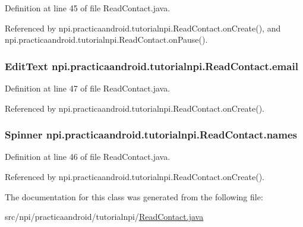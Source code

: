 Definition at line 45 of file Read\-Contact.\-java.



Referenced by npi.\-practicaandroid.\-tutorialnpi.\-Read\-Contact.\-on\-Create(), and npi.\-practicaandroid.\-tutorialnpi.\-Read\-Contact.\-on\-Pause().

\hypertarget{classnpi_1_1practicaandroid_1_1tutorialnpi_1_1_read_contact_acac2ea2aae6d7bc822b86c9ee620f3e6}{
\subsubsection[{email}]{\setlength{\rightskip}{0pt plus 5cm}Edit\-Text npi.\-practicaandroid.\-tutorialnpi.\-Read\-Contact.\-email\hspace{0.3cm}{\ttfamily [private]}}}\label{classnpi_1_1practicaandroid_1_1tutorialnpi_1_1_read_contact_acac2ea2aae6d7bc822b86c9ee620f3e6}


Definition at line 47 of file Read\-Contact.\-java.



Referenced by npi.\-practicaandroid.\-tutorialnpi.\-Read\-Contact.\-on\-Create().

\hypertarget{classnpi_1_1practicaandroid_1_1tutorialnpi_1_1_read_contact_ab89bd29616ad083286050296c58a408d}{
\subsubsection[{names}]{\setlength{\rightskip}{0pt plus 5cm}Spinner npi.\-practicaandroid.\-tutorialnpi.\-Read\-Contact.\-names\hspace{0.3cm}{\ttfamily [private]}}}\label{classnpi_1_1practicaandroid_1_1tutorialnpi_1_1_read_contact_ab89bd29616ad083286050296c58a408d}


Definition at line 46 of file Read\-Contact.\-java.



Referenced by npi.\-practicaandroid.\-tutorialnpi.\-Read\-Contact.\-on\-Create().



The documentation for this class was generated from the following file\-:\begin{DoxyCompactItemize}
\item 
src/npi/practicaandroid/tutorialnpi/\hyperlink{_read_contact_8java}{Read\-Contact.\-java}\end{DoxyCompactItemize}
